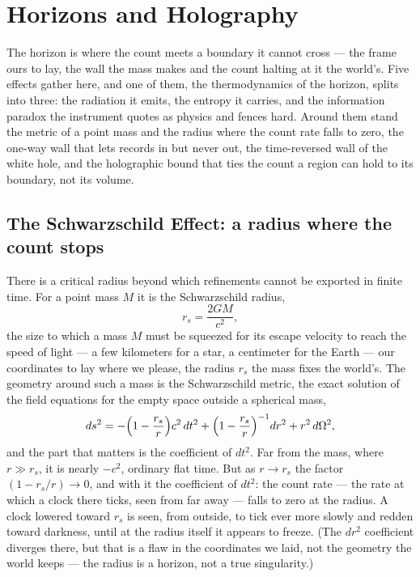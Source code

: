 \chapter{Horizons and Holography}
\label{chap:horizons-and-holography}

The horizon is where the count meets a boundary it cannot cross --- the frame ours to lay, the wall the mass
makes and the count halting at it the world's. Five effects gather here, and one of them, the
thermodynamics of the horizon, splits into three: the radiation it emits, the entropy it carries, and the
information paradox the instrument quotes as physics and fences hard. Around them stand the metric of a
point mass and the radius where the count rate falls to zero, the one-way wall that lets records in but never
out, the time-reversed wall of the white hole, and the holographic bound that ties the count a region can hold
to its boundary, not its volume.

\section{The Schwarzschild Effect: a radius where the count stops}
\label{se:schwarzschild}

There is a critical radius beyond which refinements cannot be exported in finite time. For a point mass $M$ it
is the Schwarzschild radius,
\begin{equation}
  r_s = \frac{2GM}{c^2},
\end{equation}
the size to which a mass $M$ must be squeezed for its escape velocity to reach the speed of light --- a few
kilometers for a star, a centimeter for the Earth --- our coordinates to lay where we please, the radius $r_s$
the mass fixes the world's. The geometry around such a mass is the Schwarzschild
metric, the exact solution of the field equations for the empty space outside a spherical mass,
\begin{equation}
  ds^2 = -\Bigl(1 - \frac{r_s}{r}\Bigr)c^2\,dt^2 + \Bigl(1 - \frac{r_s}{r}\Bigr)^{-1} dr^2 + r^2\, d\Omega^2,
\end{equation}
and the part that matters is the coefficient of $dt^2$. Far from the mass, where $r \gg r_s$, it is nearly $-c^2$,
ordinary flat time. But as $r \to r_s$ the factor $(1 - r_s/r) \to 0$, and with it the coefficient of $dt^2$:
the count rate --- the rate at which a clock there ticks, seen from far away --- falls to zero at the radius. A
clock lowered toward $r_s$ is seen, from outside, to tick ever more slowly and redden toward darkness, until
at the radius itself it appears to freeze. (The $dr^2$ coefficient diverges there, but that is a flaw in the
coordinates we laid, not the geometry the world keeps --- the radius is a horizon, not a true singularity.)

